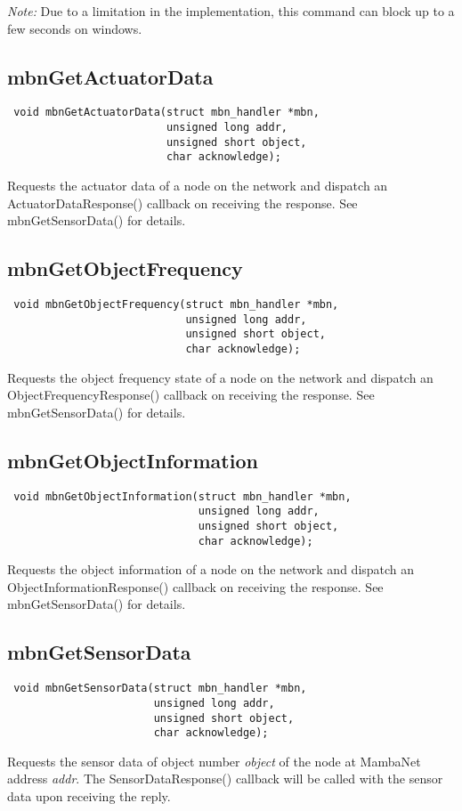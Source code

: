 \documentclass[a4paper]{report}
\begin{document}
\emph{Note:} Due to a limitation in the implementation, this command can block up to a few seconds on windows.


\subsection{mbnGetActuatorData}
\begin{verbatim}
 void mbnGetActuatorData(struct mbn_handler *mbn,
                         unsigned long addr,
                         unsigned short object,
                         char acknowledge);
\end{verbatim}
Requests the actuator data of a node on the network and dispatch an ActuatorDataResponse() callback on receiving the response. See mbnGetSensorData() for details.


\subsection{mbnGetObjectFrequency}
\begin{verbatim}
 void mbnGetObjectFrequency(struct mbn_handler *mbn,
                            unsigned long addr,
                            unsigned short object,
                            char acknowledge);
\end{verbatim}
Requests the object frequency state of a node on the network and dispatch an ObjectFrequencyResponse() callback on receiving the response. See mbnGetSensorData() for details.


\subsection{mbnGetObjectInformation}
\begin{verbatim}
 void mbnGetObjectInformation(struct mbn_handler *mbn,
                              unsigned long addr,
                              unsigned short object,
                              char acknowledge);
\end{verbatim}
Requests the object information of a node on the network and dispatch an ObjectInformationResponse() callback on receiving the response. See mbnGetSensorData() for details.


\subsection{mbnGetSensorData}
\begin{verbatim}
 void mbnGetSensorData(struct mbn_handler *mbn,
                       unsigned long addr,
                       unsigned short object,
                       char acknowledge);
\end{verbatim}
Requests the sensor data of object number \textit{object} of the node at MambaNet address \textit{addr}. The SensorDataResponse() callback will be called with the sensor data upon receiving the reply.
\end{document}
